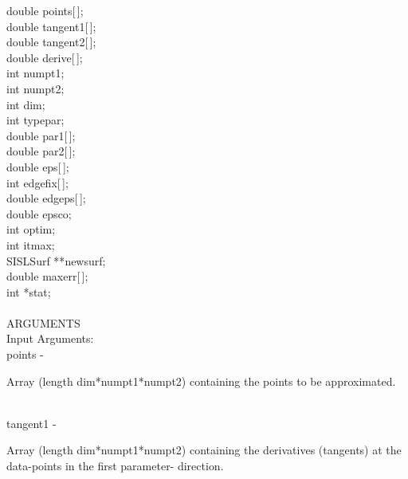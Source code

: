                 \>\>    double  \>      {\fov points}[\,];\\
                \>\>    double  \>      {\fov tangent1}[\,];\\
                \>\>    double  \>      {\fov tangent2}[\,];\\
                \>\>    double  \>      {\fov derive}[\,];\\
                \>\>    int     \>      {\fov numpt1};\\
                \>\>    int     \>      {\fov numpt2};\\
                \>\>    int     \>      {\fov dim};\\
                \>\>    int     \>      {\fov typepar};\\
                \>\>    double  \>      {\fov par1}[\,];\\
                \>\>    double  \>      {\fov par2}[\,];\\
                \>\>    double  \>      {\fov eps}[\,];\\
                \>\>    int     \>      {\fov edgefix}[\,];\\
                \>\>    double  \>      {\fov edgeps}[\,];\\
                \>\>    double  \>      {\fov epsco};\\
                \>\>    int     \>      {\fov optim};\\
                \>\>    int     \>      {\fov itmax};\\
                \>\>    SISLSurf        \>      **{\fov newsurf};\\
                \>\>    double  \>      {\fov maxerr}[\,];\\
                \>\>    int     \>      *{\fov stat};\\
\\
ARGUMENTS\\
        \>Input Arguments:\\
        \>\>    {\fov points}   \> - \> \begin{minipg2}
                                Array (length dim*numpt1*numpt2) containing the points to be
                                approximated.
                                \end{minipg2}\\[0.3ex]
        \>\>    {\fov tangent1}\> - \>  \begin{minipg2}
                                Array (length dim*numpt1*numpt2) containing the
                                derivatives (tangents) at the data-points in the first parameter-
                                direction.
                                \end{minipg2}\\[0.3ex]
